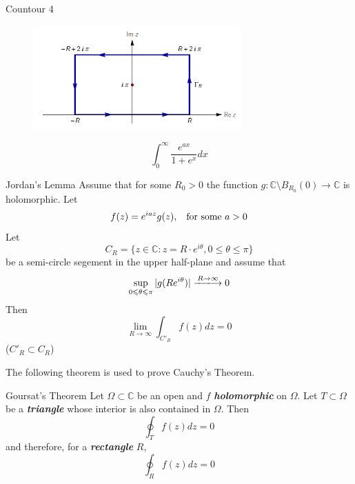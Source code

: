 \documentclass{beamer}
\begin{document}
\begin{frame}
\begin{block}{Countour 4}
\begin{figure}[h]
    \centering
    \includegraphics[width=8cm]{rectangle.png}
\end{figure}

$$\int_0^{\infty}\dfrac{e^{ax}}{1+e^x}dx$$
\end{block}
\end{frame}

\begin{frame}
\begin{block}{Jordan's Lemma}
Assume that for some $R_0>0$ the function $g:\mathbb{C}\setminus B_{R_0}(0)\rightarrow\mathbb{C}$ is holomorphic. Let
$$f(z)=e^{iaz}g(z),\hspace{3mm}\text{for some }a>0$$
Let
$$C_R=\lbrace z\in\mathbb{C}:z=R\cdot e^{i\theta},0\leqslant\theta\leqslant\pi\rbrace$$
be a semi-circle segement in the upper half-plane and assume that
$$\sup_{0\leqslant\theta\leqslant\pi}|g(Re^{i\theta})|\xlongrightarrow{R\rightarrow\infty}0$$
Then
$$\lim_{R\rightarrow \infty}\int_{C'_R}f(z)dz=0$$
($C'_R\subset C_R$)
\end{block}
\end{frame}


\begin{frame}
The following theorem is used to prove Cauchy's Theorem.
\begin{block}{Goursat's Theorem}
Let $\Omega\subset\mathbb{C}$ be an open and $f$ \textcolor[rgb]{0,0.6,0.3}{\textit{\textbf{holomorphic}}} on $\Omega$. Let $T\subset\Omega$ be a \textcolor[rgb]{0,0.6,0.3}{\textit{\textbf{triangle}}} whose interior is also contained in $\Omega$. Then
$$\oint_Tf(z)dz=0$$
and therefore, for a \textcolor[rgb]{0,0.6,0.3}{\textit{\textbf{rectangle}}} $R$,
$$\oint_Rf(z)dz=0$$
\end{block}
\end{frame}
\end{document}
